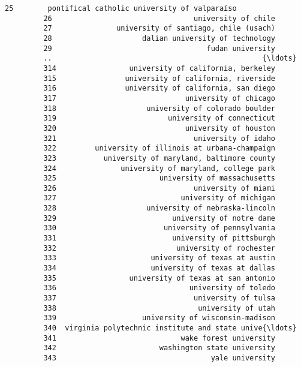 \documentclass[11pt]{article}
\begin{document}
\begin{Verbatim}[commandchars=\\\{\}]
         25        pontifical catholic university of valparaíso   
         26                                 university of chile   
         27               university of santiago, chile (usach)   
         28                     dalian university of technology   
         29                                    fudan university   
         ..                                                 {\ldots}   
         314                 university of california, berkeley   
         315                university of california, riverside   
         316                university of california, san diego   
         317                              university of chicago   
         318                     university of colorado boulder   
         319                          university of connecticut   
         320                              university of houston   
         321                                university of idaho   
         322         university of illinois at urbana-champaign   
         323           university of maryland, baltimore county   
         324               university of maryland, college park   
         325                        university of massachusetts   
         326                                university of miami   
         327                             university of michigan   
         328                     university of nebraska-lincoln   
         329                           university of notre dame   
         330                         university of pennsylvania   
         331                           university of pittsburgh   
         332                            university of rochester   
         333                      university of texas at austin   
         334                      university of texas at dallas   
         335                 university of texas at san antonio   
         336                               university of toledo   
         337                                university of tulsa   
         338                                 university of utah   
         339                    university of wisconsin-madison   
         340  virginia polytechnic institute and state unive{\ldots}   
         341                             wake forest university   
         342                        washington state university   
         343                                    yale university   
         

\end{Verbatim}
\end{document}
